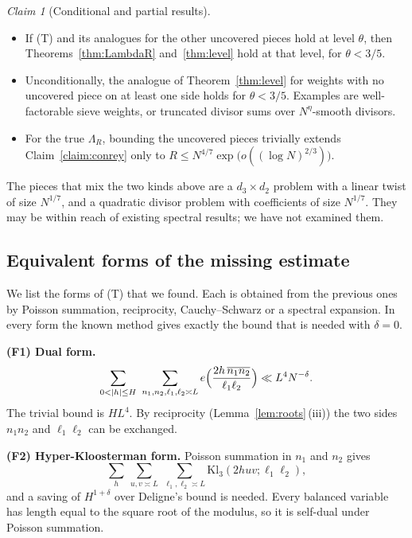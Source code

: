 \documentclass[11pt]{amsart}
\theoremstyle{definition}
\theoremstyle{remark}
\newtheorem{claim}[theorem]{Claim}
\numberwithin{equation}{section}
\newcommand{\inv}[1]{\overline{#1}}
\begin{document}
\begin{claim}[Conditional and partial results]\label{claim:conditional}
\leavevmode
\begin{itemize}
\item If (T) and its analogues for the other uncovered pieces hold at
level $\theta$, then Theorems~\ref{thm:LambdaR} and~\ref{thm:level} hold at
that level, for $\theta<3/5$.
\item Unconditionally, the analogue of Theorem~\ref{thm:level} for weights
with no uncovered piece on at least one side holds for $\theta<3/5$.
Examples are well-factorable sieve weights, or truncated divisor sums over
$N^{\eta}$-smooth divisors.
\item For the true $\Lambda_R$, bounding the uncovered pieces trivially
extends Claim~\ref{claim:conrey} only to
$R\le N^{4/7}\exp\bigl(o((\log N)^{2/3})\bigr)$.
\end{itemize}
\end{claim}

The pieces that mix the two kinds above are a $d_3\times d_2$ problem with a
linear twist of size $N^{1/7}$, and a quadratic divisor problem with
coefficients of size $N^{1/7}$.  They may be within reach of existing
spectral results; we have not examined them.

\subsection{Equivalent forms of the missing estimate}\label{sec:forms}
We list the forms of (T) that we found.  Each is obtained from the previous
ones by Poisson summation, reciprocity, Cauchy--Schwarz or a spectral
expansion.  In every form the known method gives exactly the bound that is
needed with $\delta=0$.

\medskip
\noindent\textbf{(F1) Dual form.}
\[
 \sum_{0<|h|\le H}\ \sum_{n_1,n_2,\ell_1,\ell_2\asymp L}
 e\Bigl(\frac{2h\,\inv{n_1n_2}}{\ell_1\ell_2}\Bigr)\ll L^{4}N^{-\delta}.
\]
The trivial bound is $HL^4$.  By reciprocity
(Lemma~\ref{lem:roots}\,(iii)) the two sides $n_1n_2$ and $\ell_1\ell_2$
can be exchanged.

\medskip
\noindent\textbf{(F2) Hyper-Kloosterman form.}  Poisson summation in $n_1$
and $n_2$ gives
\[
 \sum_{h}\ \sum_{u,v\asymp L}\ \sum_{\ell_1,\ell_2\asymp L}
 \mathrm{Kl}_3(2huv;\ell_1\ell_2),
\]
and a saving of $H^{1+\delta}$ over Deligne's bound is needed.  Every
balanced variable has length equal to the square root of the modulus, so it
is self-dual under Poisson summation.
\end{document}
